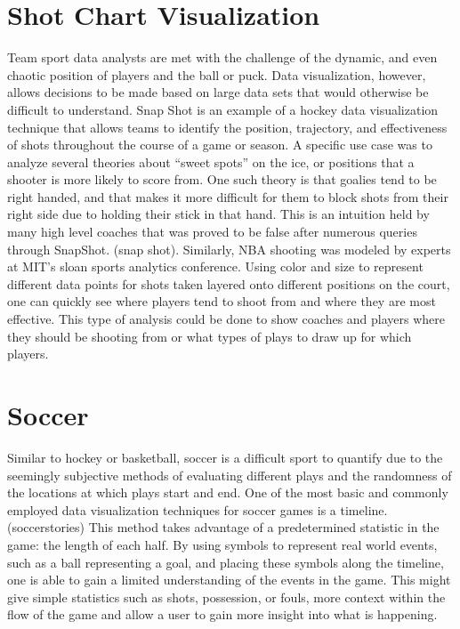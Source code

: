 \documentclass[sigconf]{acmart}
\begin{document}
\section{Shot Chart Visualization}Team sport data analysts are met with the challenge of the dynamic, and even chaotic position of players and the ball or puck. Data visualization, however, allows decisions to be made based on large data sets that would otherwise be difficult to understand. Snap Shot is an example of a hockey data visualization technique that allows teams to identify the position, trajectory, and effectiveness of shots throughout the course of a game or season. A specific use case was to analyze several theories about “sweet spots” on the ice, or positions that a shooter is more likely to score from. One such theory is that goalies tend to be right handed, and that makes it more difficult for them to block shots from their right side due to holding their stick in that hand. This is an intuition held by many high level coaches that was proved to be false after numerous queries through SnapShot. (snap shot). Similarly, NBA shooting was modeled by experts at MIT’s sloan sports analytics conference. Using color and size to represent different data points for shots taken layered onto different positions on the court, one can quickly see where players tend to shoot from and where they are most effective. This type of analysis could be done to show coaches and players where they should be shooting from or what types of plays to draw up for which players.
\section{Soccer}Similar to hockey or basketball, soccer is a difficult sport to quantify due to the seemingly subjective methods of evaluating different plays and the randomness of the locations at which plays start and end. One of the most basic and commonly employed data visualization techniques for soccer games is a timeline. (soccerstories) This method takes advantage of a predetermined statistic in the game: the length of each half. By using symbols to represent real world events, such as a ball representing a goal, and placing these symbols along the timeline, one is able to gain a limited understanding of the events in the game. This might give simple statistics such as shots, possession, or fouls, more context within the flow of the game and allow a user to gain more insight into what is happening. 
\end{document}

